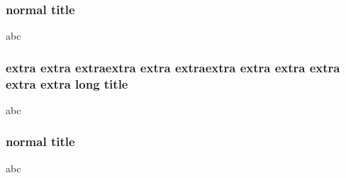 \documentclass{beamer}
\begin{document}
    \begin{frame}
        \frametitle{normal title}
        abc
    \end{frame} 

{   
    \begin{frame}
        \frametitle{extra extra extraextra extra extraextra extra extra extra extra extra long title}
        abc
    \end{frame}         
}

    \begin{frame}
        \frametitle{normal title}
        abc
    \end{frame} 
\end{document}
